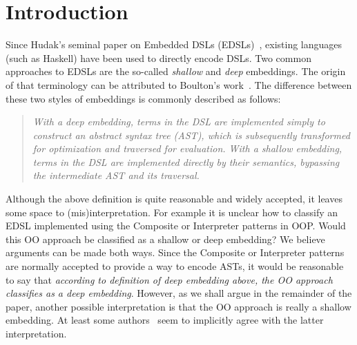 \section{Introduction}

Since Hudak's seminal paper on Embedded DSLs (EDSLs)~\cite{}, existing
languages (such as Haskell) have been used to directly encode
DSLs. Two common approaches to EDSLs are the so-called \emph{shallow}
and \emph{deep} embeddings. The origin of that terminology can be
attributed to Boulton's work~\cite{}. The difference between these
two styles of embeddings is commonly described as follows:

\begin{quote}
\emph{With a deep embedding, terms in the DSL are implemented simply to
construct an abstract syntax tree (AST), which is subsequently
transformed for optimization and traversed for evaluation. With a
shallow embedding, terms in the DSL are implemented directly by
their semantics, bypassing the intermediate AST and its traversal.}\cite{gibbons15folding}
\end{quote}


Although the above definition is quite reasonable and widely accepted,
it leaves some space to (mis)interpretation. For example it is unclear 
how to classify an EDSL implemented using the {\sc Composite} or {\sc Interpreter} 
patterns in OOP. Would this OO approach be
classified as a shallow or deep embedding? We believe arguments can be
made both ways. Since the {\sc Composite} or {\sc Interpreter}
patterns are normally accepted to provide a way to encode ASTs, it would be
reasonable to say that \emph{according to definition of deep embedding
  above, the OO approach classifies as a deep
  embedding}. However, as we shall argue in the remainder of the
paper, another possible interpretation is that the OO approach is
really a shallow embedding. At least some authors~\cite{} seem to
implicitly agree with 
the latter interpretation.

